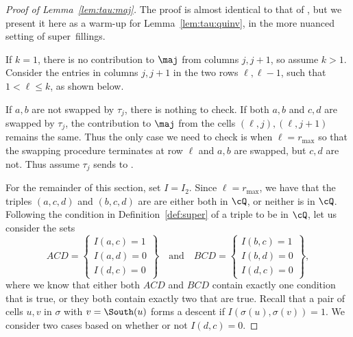 \begin{proof}[Proof of Lemma~\ref{lem:tau:maj}] The proof is almost identical to that of \cite[Lemma 3.10]{compactformula}, but we present it here as a warm-up for Lemma~\ref{lem:tau:quinv}, in the more nuanced setting of super~fillings.

If $k=1$, there is no contribution to $\maj$ from columns $j,j+1$, so assume $k>1$. Consider the entries in columns $j,j+1$ in the two rows $\ell,\ell-1$, such that $1 < \ell \leq k$, as shown below.

\begin{center}
\end{center}


If $a,b$ are not swapped by $\tau_j$, there is nothing to check. If both $a,b$ and $c,d$ are swapped by $\tau_j$, the contribution to $\maj$ from the cells $(\ell,j),(\ell,j+1)$ remains the same. Thus the only case we need to check is when $\ell=r_{\max}$ so that the swapping procedure terminates at row $\ell$ and $a,b$ are swapped, but $c,d$ are not. Thus assume $\tau_j$ sends  to  .

For the remainder of this section, set $I=I_2$. Since $\ell=r_{\max}$, we have that the triples $(a,c,d)$ and $(b,c,d)$ are are either both in $\cQ$, or neither is in $\cQ$. Following the condition in Definition~\ref{def:super} of a triple to be in $\cQ$, let us consider the sets
\[ 
ACD = \left\{\begin{matrix}I(a,c)=1\\I(a,d)=0\\I(d,c)=0 \end{matrix} \right\} 
\quad \mbox{and} \quad 
BCD = \left\{\begin{matrix}I(b,c)=1\\I(b,d)=0\\I(d,c)=0 \end{matrix} \right\},
\]
where we know that either both $ACD$ and $BCD$ contain exactly one condition that is true, or they both contain exactly two that are true. Recall that a pair of cells $u,v$ in $\sigma$ with $v=\South(u)$ forms a descent if $I(\sigma(u),\sigma(v))=1$. We consider two cases based on whether or not $I(d,c)=0$.


\end{proof}
